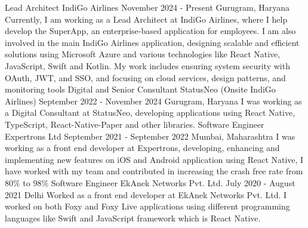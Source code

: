 

\begin{cventries}

\cventry
    {Lead Architect} %
    {IndiGo Airlines} %
    {November 2024 - Present} %
    {Gurugram, Haryana} %
    {
        Currently, I am working as a Lead Architect at IndiGo Airlines, where I help develop the SuperApp, an enterprise-based application for employees. I am also involved in the main IndiGo Airlines application, designing scalable and efficient solutions using Microsoft Azure and various technologies like React Native, JavaScript, Swift and Kotlin. My work includes ensuring system security with OAuth, JWT, and SSO, and focusing on cloud services, design patterns, and monitoring tools 
    }
\vspace{1.0em}
\cventry
    {Digital and Senior Consultant} %
    {StatusNeo (Onsite IndiGo Airlines)} %
    {September 2022 - November 2024} %
    {Gurugram, Haryana} %
    {
        I was working as a Digital Consultant at StatusNeo, developing applications using React Native, TypeScript, React-Native-Paper and other libraries.
    }
\vspace{1.0em}
\cventry
    {Software Engineer} %
    {Expertrons Ltd} %
    {September 2021 - September 2022} %
    {Mumbai, Maharashtra} %
    {
        I was working as a front end developer at Expertrons, developing, enhancing and implementing new features on iOS and Android application using React Native, I have worked with my team and contributed in increasing the crash free rate from 80\% to 98\%
    }
\vspace{1.0em}
\cventry
    {Software Engineer} %
    {EkAnek Networks Pvt. Ltd.} %
    {July 2020 - August 2021} %
    {Delhi} %
    {
        Worked as a front end developer at EkAnek Networks Pvt. Ltd. I worked on both Foxy and Foxy Live applications using different programming languages like Swift and JavaScript framework which is React Native.
    }
\vspace{1.0em}

\end{cventries}
